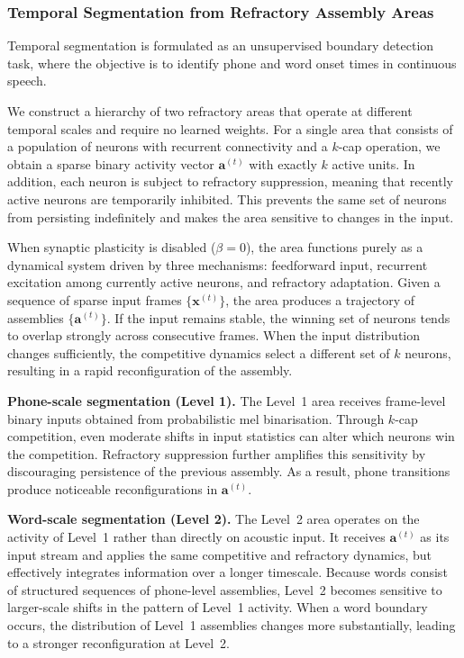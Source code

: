 

\subsubsection{Temporal Segmentation from Refractory Assembly Areas}
Temporal segmentation is formulated as an unsupervised boundary detection task, where the objective is to identify phone and word onset times in continuous speech.

We construct a hierarchy of two refractory areas that operate at different temporal scales and require no learned weights.
For a single area that consists of a population of neurons with recurrent connectivity and a $k$-cap operation, we obtain a sparse binary activity vector $\mathbf{a}^{(t)}$ with exactly $k$ active units. In addition, each neuron is subject to refractory suppression, meaning that recently active neurons are temporarily inhibited. This prevents the same set of neurons from persisting indefinitely and makes the area sensitive to changes in the input.

When synaptic plasticity is disabled ($\beta = 0$), the area functions purely as a dynamical system driven by three mechanisms: feedforward input, recurrent excitation among currently active neurons, and refractory adaptation. Given a sequence of sparse input frames $\{\mathbf{x}^{(t)}\}$, the area produces a trajectory of assemblies $\{\mathbf{a}^{(t)}\}$. If the input remains stable, the winning set of neurons tends to overlap strongly across consecutive frames. When the input distribution changes sufficiently, the competitive dynamics select a different set of $k$ neurons, resulting in a rapid reconfiguration of the assembly.

\noindent\textbf{Phone-scale segmentation (Level 1).}
The Level~1 area receives frame-level binary inputs obtained from probabilistic mel binarisation. Through $k$-cap competition, even moderate shifts in input statistics can alter which neurons win the competition. Refractory suppression further amplifies this sensitivity by discouraging persistence of the previous assembly. As a result, phone transitions produce noticeable reconfigurations in $\mathbf{a}^{(t)}$.

\noindent\textbf{Word-scale segmentation (Level 2).}
The Level~2 area operates on the activity of Level~1 rather than directly on acoustic input. It receives $\mathbf{a}^{(t)}$ as its input stream and applies the same competitive and refractory dynamics, but effectively integrates information over a longer timescale. Because words consist of structured sequences of phone-level assemblies, Level~2 becomes sensitive to larger-scale shifts in the pattern of Level~1 activity. When a word boundary occurs, the distribution of Level~1 assemblies changes more substantially, leading to a stronger reconfiguration at Level~2.


